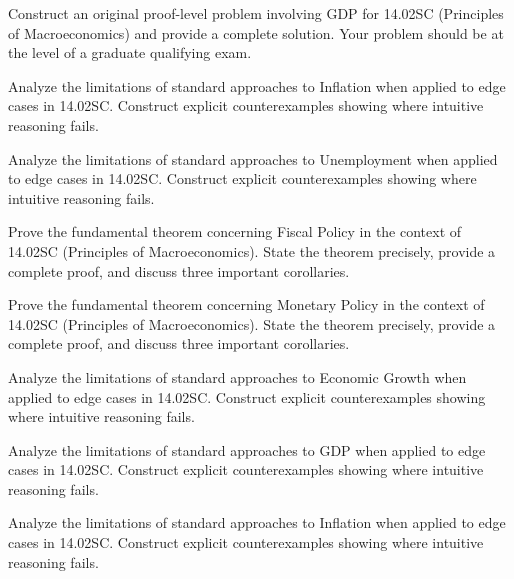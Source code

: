 \documentclass[12pt,a4paper]{exam}
\begin{document}
\begin{questions}

\question[3]
Construct an original proof-level problem involving GDP for 14.02SC (Principles of Macroeconomics) and provide a complete solution. Your problem should be at the level of a graduate qualifying exam.

\vspace{0.3cm}

\question[5]
Analyze the limitations of standard approaches to Inflation when applied to edge cases in 14.02SC. Construct explicit counterexamples showing where intuitive reasoning fails.

\vspace{0.3cm}

\question[9]
Analyze the limitations of standard approaches to Unemployment when applied to edge cases in 14.02SC. Construct explicit counterexamples showing where intuitive reasoning fails.

\vspace{0.3cm}

\question[3]
Prove the fundamental theorem concerning Fiscal Policy in the context of 14.02SC (Principles of Macroeconomics). State the theorem precisely, provide a complete proof, and discuss three important corollaries.

\vspace{0.3cm}

\question[5]
Prove the fundamental theorem concerning Monetary Policy in the context of 14.02SC (Principles of Macroeconomics). State the theorem precisely, provide a complete proof, and discuss three important corollaries.

\vspace{0.3cm}

\question[7]
Analyze the limitations of standard approaches to Economic Growth when applied to edge cases in 14.02SC. Construct explicit counterexamples showing where intuitive reasoning fails.

\vspace{0.3cm}

\question[3]
Analyze the limitations of standard approaches to GDP when applied to edge cases in 14.02SC. Construct explicit counterexamples showing where intuitive reasoning fails.

\vspace{0.3cm}

\question[4]
Analyze the limitations of standard approaches to Inflation when applied to edge cases in 14.02SC. Construct explicit counterexamples showing where intuitive reasoning fails.


\end{questions}
\end{document}

